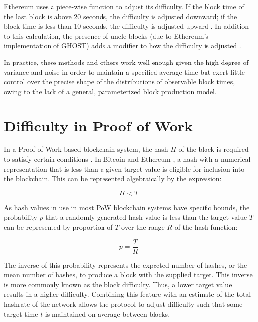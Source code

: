 \documentclass[]{article}
\begin{document}
Ethereum uses a piece-wise function to adjust its difficulty.  If the block time of the last block is above 20 seconds, the difficulty is adjusted downward; if the block time is less than 10 seconds, the difficulty is adjusted upward \cite{EthereumDifficulty}.  In addition to this calculation, the presence of uncle blocks (due to Ethereum’s implementation of GHOST) adds a modifier to how the difficulty is adjusted \cite{EthereumUncles}.
\newline

In practice, these methods and others work well enough given the high degree of variance and noise in order to maintain a specified average time but exert little control over the precise shape of the distributions of observable block times, owing to the lack of a general, parameterized block production model.

\section{Difficulty in Proof of Work}
In a Proof of Work based blockchain system, the hash $H$ of the block is required to satisfy certain conditions \cite{BitcoinWhitepaper}.  In Bitcoin \cite{BitcoinPOW} and Ethereum \cite{EthereumPOW} \cite{EthereumYellowpaper}, a hash with a numerical representation that is less than a given target value is eligible for inclusion into the blockchain.  This can be represented algebraically by the expression:

\begin{equation}
H < T
\end{equation}

As hash values in use in most PoW blockchain systems have specific bounds, the probability $p$ that a randomly generated hash value is less than the target value $T$ can be represented by proportion of $T$ over the range $R$ of the hash function: 

\begin{equation}
	p = \frac{T}{R} 
\end{equation}

The inverse of this probability represents the expected number of hashes, or the mean number of hashes, to produce a block with the supplied target.  This inverse is more commonly known as the block difficulty.  Thus, a lower target value results in a higher difficulty.  Combining this feature with an estimate of the total hashrate of the network allows the protocol to adjust difficulty such that some target time $t$ is maintained on average between blocks.  
\end{document}
